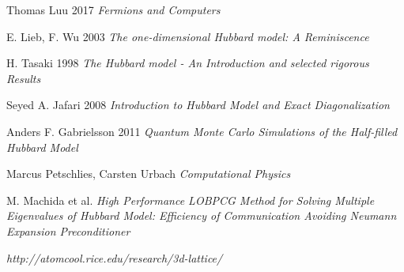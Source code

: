  
\begin{thebibliography}{9}
	
	Thomas Luu 2017
	\textit{Fermions and Computers}
	
	E. Lieb, F. Wu 2003
	\textit{The one-dimensional Hubbard model: A Reminiscence}
	
	H. Tasaki 1998
	\textit{The Hubbard model - An Introduction and selected rigorous Results}
	
	Seyed A. Jafari 2008
	\textit{Introduction to Hubbard Model and Exact Diagonalization}
	
	Anders F. Gabrielsson 2011
	\textit{Quantum Monte Carlo Simulations of
		the Half-filled Hubbard Model}
	
	Marcus Petschlies, Carsten Urbach \textit{Computational Physics}
	
	M. Machida et al. \textit{High Performance LOBPCG Method for Solving Multiple Eigenvalues of Hubbard Model: Efficiency of Communication Avoiding Neumann Expansion Preconditioner}
	
	\textit{http://atomcool.rice.edu/research/3d-lattice/}
\end{thebibliography}
\clearpage
